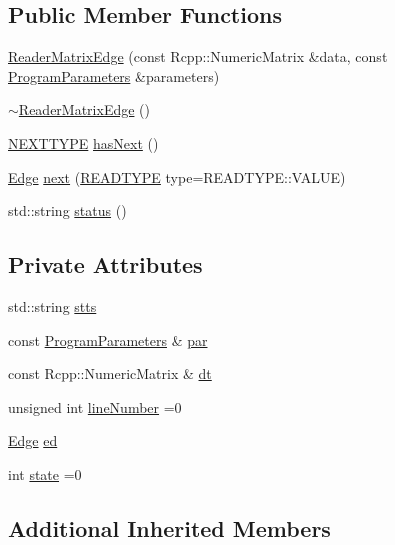 \subsection*{Public Member Functions}
\begin{DoxyCompactItemize}
\item 
\hyperlink{classReaderMatrixEdge_a8bb3d1f9b91410abcfc2bc1c3becea5c}{Reader\+Matrix\+Edge} (const Rcpp\+::\+Numeric\+Matrix \&data, const \hyperlink{structProgramParameters}{Program\+Parameters} \&parameters)
\item 
\hyperlink{classReaderMatrixEdge_ae6a8f85585a25e38164c2bf8ec18c9b8}{$\sim$\+Reader\+Matrix\+Edge} ()
\item 
\hyperlink{classReaderInterface_ac2420ec8d2f60feadf2533d4fa77ec5e}{N\+E\+X\+T\+T\+Y\+PE} \hyperlink{classReaderMatrixEdge_a61598aded2eab7ef2024636a5381423b}{has\+Next} ()
\item 
\hyperlink{classEdge}{Edge} \hyperlink{classReaderMatrixEdge_a98657215956d975c4f81b7e1d6e90b3e}{next} (\hyperlink{classReaderInterface_a1e3610c289ae058a246de41154d8a266}{R\+E\+A\+D\+T\+Y\+PE} type=R\+E\+A\+D\+T\+Y\+P\+E\+::\+V\+A\+L\+UE)
\item 
std\+::string \hyperlink{classReaderMatrixEdge_a14cfd06f703e6a24d007514e5dee24ff}{status} ()
\end{DoxyCompactItemize}
\subsection*{Private Attributes}
\begin{DoxyCompactItemize}
\item 
std\+::string \hyperlink{classReaderMatrixEdge_aabdc3b2ee9060a35c7e6b04afcebf9f9}{stts}
\item 
const \hyperlink{structProgramParameters}{Program\+Parameters} \& \hyperlink{classReaderMatrixEdge_a6bca38a1fa952962db149712f9468aec}{par}
\item 
const Rcpp\+::\+Numeric\+Matrix \& \hyperlink{classReaderMatrixEdge_ab8d64c5359cb60152b277b735616f3fd}{dt}
\item 
unsigned int \hyperlink{classReaderMatrixEdge_a07bbdbe9f633b2ca36e630a0eeba4010}{line\+Number} =0
\item 
\hyperlink{classEdge}{Edge} \hyperlink{classReaderMatrixEdge_a64e36f8be27ab6fd91be7b7213f748c5}{ed}
\item 
int \hyperlink{classReaderMatrixEdge_aa2c426f8207b7317ed84941d712ed0f0}{state} =0
\end{DoxyCompactItemize}
\subsection*{Additional Inherited Members}



